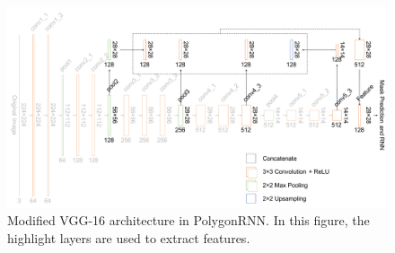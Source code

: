 \begin{figure}[!h]
	\centering
	\includegraphics[width=\fig\textwidth]{3-02.pdf}
    \caption[Modified VGG-16 architecture in PolygonRNN]{Modified VGG-16 architecture in PolygonRNN. In this figure, the highlight layers are used to extract features.}
    \label{fig:mdfvgg16}
\end{figure}